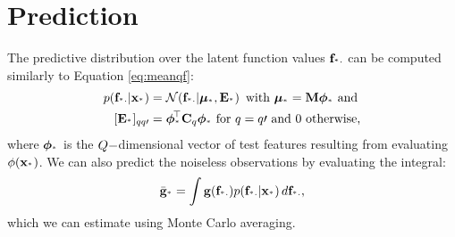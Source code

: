 \section{Prediction}
The predictive distribution over the latent function values $\mathbf{f}_{^{*} \cdot}$ can be 
computed similarly to Equation \eqref{eq:meanqf}:
\begin{align}
\probC{\latentstest}{   \ins_{\test} } &= \gausC{\latentstest}{\muftest, \covftest} \text{ with }
\muftest= \pWeights \featstest  \text{ and}\\
[\covftest]_{qq\prime}  &=  \featstest\transpose  \pocov_q \featstest \text{ for } q = q\prime \text{  and } 0 \text{ otherwise,} 
\end{align}
where $\boldsymbol\phi_{^{*}}$ is the $Q-$dimensional vector of test features resulting from evaluating $\phi\!\left({{\mathbf{x}_{^{*}}}}\right)$.
%
We can also predict the noiseless observations by evaluating the  integral:
\begin{equation}
  \bar{\mathbf{g}}_{^{*}} =  \int \mathbf{g}(\mathbf{f}_{^{*} \cdot})  p\!\left({\mathbf{f}_{^{*} \cdot}}\middle\vert{   \ensuremath{\mathbf{x}}_{\ensuremath{^{*}}} }\right) d \mathbf{f}_{^{*} \cdot} \text{,}
 \end{equation}
which we can estimate using Monte Carlo averaging. 
